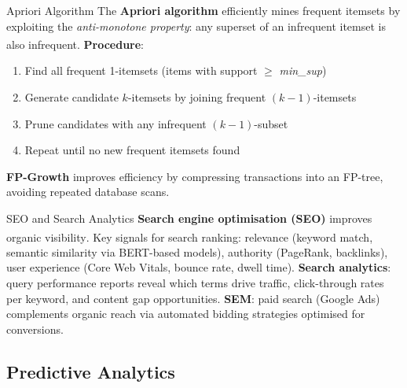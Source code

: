 \begin{v3topic}{Apriori Algorithm}
    The \textbf{Apriori algorithm} efficiently mines frequent itemsets by exploiting the \emph{anti-monotone property}: any superset of an infrequent itemset is also infrequent\textsuperscript{\cite[][pp.~222--226]{leskovecMiningMassiveDatasets2014}}.
\visualseparator
    \textbf{Procedure}:
    \begin{enumerate}
        \item Find all frequent 1-itemsets (items with support $\geq$ \textit{min\_sup})
        \item Generate candidate $k$-itemsets by joining frequent $(k-1)$-itemsets
        \item Prune candidates with any infrequent $(k-1)$-subset
        \item Repeat until no new frequent itemsets found
    \end{enumerate}
    \textbf{FP-Growth} improves efficiency by compressing transactions into an FP-tree, avoiding repeated database scans.

\end{v3topic}
\begin{v3topic}{SEO and Search Analytics}
    \textbf{Search engine optimisation (SEO)} improves organic visibility\textsuperscript{\cite[][pp.~130--136]{chaffeyDigitalBusinessECommerce2019}}.
    Key signals for search ranking: relevance (keyword match, semantic similarity via BERT-based models), authority (PageRank, backlinks), user experience (Core Web Vitals, bounce rate, dwell time).
    \textbf{Search analytics}: query performance reports reveal which terms drive traffic, click-through rates per keyword, and content gap opportunities.
    \textbf{SEM}: paid search (Google Ads) complements organic reach via automated bidding strategies optimised for conversions.

\end{v3topic}

\subsection{Predictive Analytics}


